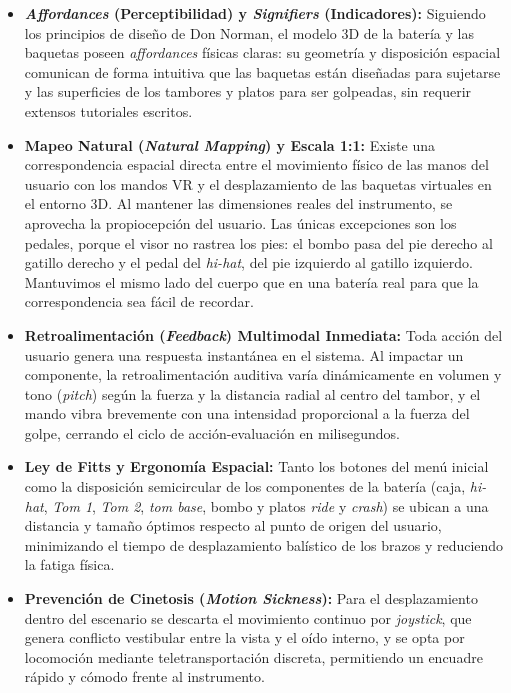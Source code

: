 \documentclass{article}
\begin{document}
\begin{itemize}
    \item \textbf{\textit{Affordances} (Perceptibilidad) y \textit{Signifiers} (Indicadores):} Siguiendo los principios de diseño de Don Norman, el modelo 3D de la batería y las baquetas poseen \textit{affordances} físicas claras: su geometría y disposición espacial comunican de forma intuitiva que las baquetas están diseñadas para sujetarse y las superficies de los tambores y platos para ser golpeadas, sin requerir extensos tutoriales escritos.
    \item \textbf{Mapeo Natural (\textit{Natural Mapping}) y Escala 1:1:} Existe una correspondencia espacial directa entre el movimiento físico de las manos del usuario con los mandos VR y el desplazamiento de las baquetas virtuales en el entorno 3D. Al mantener las dimensiones reales del instrumento, se aprovecha la propiocepción del usuario. Las únicas excepciones son los pedales, porque el visor no rastrea los pies: el bombo pasa del pie derecho al gatillo derecho y el pedal del \textit{hi-hat}, del pie izquierdo al gatillo izquierdo. Mantuvimos el mismo lado del cuerpo que en una batería real para que la correspondencia sea fácil de recordar.
    \item \textbf{Retroalimentación (\textit{Feedback}) Multimodal Inmediata:} Toda acción del usuario genera una respuesta instantánea en el sistema. Al impactar un componente, la retroalimentación auditiva varía dinámicamente en volumen y tono (\textit{pitch}) según la fuerza y la distancia radial al centro del tambor, y el mando vibra brevemente con una intensidad proporcional a la fuerza del golpe, cerrando el ciclo de acción-evaluación en milisegundos.
    \item \textbf{Ley de Fitts y Ergonomía Espacial:} Tanto los botones del menú inicial como la disposición semicircular de los componentes de la batería (caja, \textit{hi-hat}, \textit{Tom 1}, \textit{Tom 2}, \textit{tom base}, bombo y platos \textit{ride} y \textit{crash}) se ubican a una distancia y tamaño óptimos respecto al punto de origen del usuario, minimizando el tiempo de desplazamiento balístico de los brazos y reduciendo la fatiga física.
    \item \textbf{Prevención de Cinetosis (\textit{Motion Sickness}):} Para el desplazamiento dentro del escenario se descarta el movimiento continuo por \textit{joystick}, que genera conflicto vestibular entre la vista y el oído interno, y se opta por locomoción mediante teletransportación discreta, permitiendo un encuadre rápido y cómodo frente al instrumento.
\end{itemize}
\end{document}
